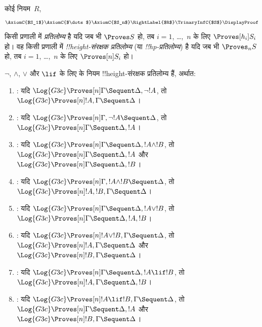 \documentclass[../../../include/open-logic-section]{subfiles}
\begin{document}


\begin{defn}
कोई नियम~$R$,
\[
\AxiomC{$S_1$}
\AxiomC{$\dots$}
\AxiomC{$S_n$}
\RightLabel{$R$}
\TrinaryInfC{$S$}
\DisplayProof
\]
किसी प्रणाली में \emph{प्रतिलोम्य} है यदि जब भी $\Proves S$ हो, तब $i = 1$,
\dots,~$n$ के लिए $\Proves[h_i] S_i$ हो। वह किसी प्रणाली में
\emph{!!{height}-संरक्षक प्रतिलोम्य} (या \emph{!!{hp}-प्रतिलोम्य}) है यदि जब
भी $\Proves_n S$ हो, तब $i = 1$, \dots,~$n$ के लिए $\Proves[n] S_i$ हो।
\end{defn}

\begin{lem}
$\lnot$, $\land$, $\lor$ और $\lif$ के लिए  के नियम
!!{height}-संरक्षक प्रतिलोम्य हैं, अर्थात:
\begin{enumerate}
  \item \RightR{\lnot}: यदि $\Log{G3c} \Proves[n] \Gamma \Sequent
  \Delta, \lnot !A$, तो $\Log{G3c} \Proves[n] !A, \Gamma \Sequent
  \Delta$।
  \item \LeftR{\lnot}: यदि $\Log{G3c} \Proves[n] \Gamma, \lnot !A
  \Sequent \Delta$, तो $\Log{G3c} \Proves[n] \Gamma \Sequent \Delta,
  !A$।
  \item \RightR{\land}: यदि $\Log{G3c} \Proves[n] \Gamma \Sequent
  \Delta, !A \land !B$, तो $\Log{G3c} \Proves[n] \Gamma \Sequent
  \Delta, !A$ और $\Log{G3c} \Proves[n] \Gamma \Sequent
  \Delta, !B$।
  \item \LeftR{\land}: यदि $\Log{G3c} \Proves[n] \Gamma, !A \land !B
  \Sequent \Delta$, तो $\Log{G3c} \Proves[n] !A, !B, \Gamma \Sequent
  \Delta$।
  \item \RightR{\lor}: यदि $\Log{G3c} \Proves[n] \Gamma \Sequent
  \Delta, !A \lor !B$, तो $\Log{G3c} \Proves[n] \Gamma \Sequent
  \Delta, !A, !B$।
  \item \LeftR{\lor}: यदि $\Log{G3c} \Proves[n] !A \lor !B, \Gamma \Sequent
  \Delta$, तो $\Log{G3c} \Proves[n] !A, \Gamma \Sequent
  \Delta$ और $\Log{G3c} \Proves[n] !B, \Gamma \Sequent
  \Delta$।
  \item \RightR{\lif}: यदि $\Log{G3c} \Proves[n] \Gamma \Sequent
  \Delta, !A \lif !B$, तो $\Log{G3c} \Proves[n] !A, \Gamma \Sequent
  \Delta, !B$।
  \item \LeftR{\lif}: यदि $\Log{G3c} \Proves[n] !A \lif !B, \Gamma
  \Sequent \Delta$, तो $\Log{G3c} \Proves[n] \Gamma \Sequent \Delta,
  !A$ और $\Log{G3c} \Proves[n] !B, \Gamma \Sequent \Delta$।
\end{enumerate}
\end{lem}
\end{document}
